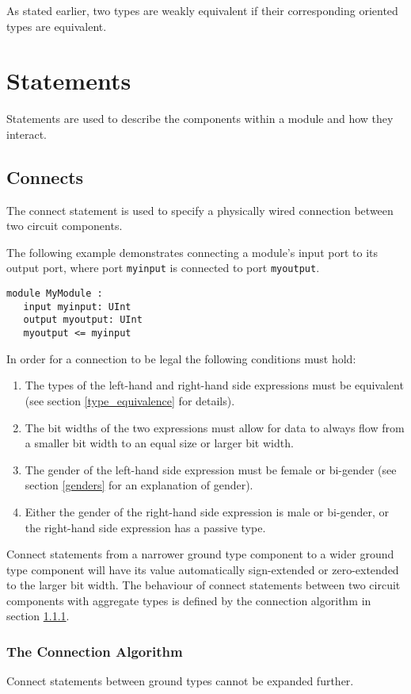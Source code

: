 \documentclass[12pt]{article}
\begin{document}
As stated earlier, two types are weakly equivalent if their corresponding oriented types are equivalent.


\section{Statements} \label{statements}

Statements are used to describe the components within a module and how they interact.

\subsection{Connects}\label{connects}
The connect statement is used to specify a physically wired connection between two circuit components.

The following example demonstrates connecting a module's input port to its output port, where port \verb|myinput| is connected to port \verb|myoutput|.
\begin{lstlisting}
module MyModule :
   input myinput: UInt
   output myoutput: UInt
   myoutput <= myinput
\end{lstlisting}

In order for a connection to be legal the following conditions must hold:
\begin{enumerate}
\item The types of the left-hand and right-hand side expressions must be equivalent (see section \ref{type_equivalence} for details).
\item The bit widths of the two expressions must allow for data to always flow from a smaller bit width to an equal size or larger bit width.
\item The gender of the left-hand side expression must be female or bi-gender (see section \ref{genders} for an explanation of gender).
\item Either the gender of the right-hand side expression is male or bi-gender, or the right-hand side expression has a passive type.
\end{enumerate}

Connect statements from a narrower ground type component to a wider ground type component will have its value automatically sign-extended or zero-extended to the larger bit width. The behaviour of connect statements between two circuit components with aggregate types is defined by the connection algorithm in section \ref{connection_algorithm}.

\subsubsection{The Connection Algorithm} \label{connection_algorithm}
Connect statements between ground types cannot be expanded further. 
\end{document}
